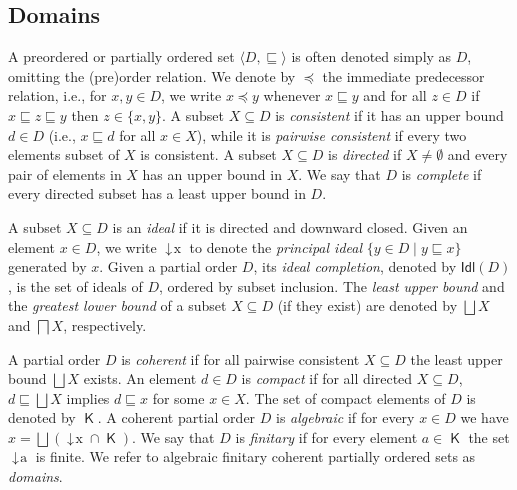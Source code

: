 \documentclass[conference]{IEEEtran}
\newcommand{\compact}[1]{\ensuremath{\mathop{\mathsf{K}({#1})}}}
\newcommand{\principal}[1]{\ensuremath{\mathop{\downarrow\!{#1}}}}
\newcommand{\ideal}[1]{\ensuremath{\mathsf{Idl}({#1})}}
\begin{document}
\subsection{Domains}
\label{ss:domains}

A preordered or partially ordered set $\langle D, \sqsubseteq \rangle$
is often denoted simply as $D$, omitting the (pre)order
relation.  We denote by
$\preceq$ the immediate predecessor relation, i.e., for $x, y \in D$, 
we write $x \preceq y$ whenever
$x \sqsubseteq y$ and for all $z \in D$ if
$x \sqsubseteq z \sqsubseteq y$ then $z \in \{x,y\}$.
%
A subset $X \subseteq D$ is \emph{consistent}
if it has an upper bound $d \in D$  (i.e., $x \sqsubseteq d$ for all $x \in X$),
while it is \emph{pairwise consistent} if
every two elements subset 
of $X$ is consistent.
%
A subset $X \subseteq D$ is \emph{directed} if $X \neq \emptyset$ and
every pair of elements in $X$ has an upper bound in $X$. We say that
$D$ is \emph{complete} if every directed subset has a least upper
bound in $D$.

A subset $X \subseteq D$ is an \emph{ideal} if it is directed and
downward closed.
%
Given an element $x \in D$, we write $\principal{x}$ to
denote the \emph{principal ideal} $\{ y \in D \mid y \sqsubseteq x \}$ generated by $x$.
Given a partial order $D$, its \emph{ideal completion}, denoted by $\ideal{D}$, is the
set of ideals of $D$,  ordered by subset inclusion.
%
The \emph{least upper bound} and the \emph{greatest lower bound} of a
subset $X \subseteq D$ (if they exist) are denoted by $\bigsqcup X$
and $\bigsqcap X$, respectively.

\begin{definition}[domains]
  \label{c-de:domain}
  A partial order $D$ is \emph{coherent} if for all
  pairwise  consistent $X \subseteq D$ the least
  upper bound $\bigsqcup X$ exists. 
  An element $d \in D$ is \emph{compact} if for all directed
  $X \subseteq D$, $d \sqsubseteq \bigsqcup X$ implies
  $d \sqsubseteq x$ for some $x \in X$. The set of compact
  elements of $D$ is denoted by $\compact{D}$.
  A coherent partial order $D$ is \emph{algebraic}
  if for every $x \in D$ we have
  $x = \bigsqcup (\principal{x} \cap \compact{D})$.  We say that $D$
  is \emph{finitary} if for every element $a \in \compact{D}$ the set
  $\principal{a}$ is finite.
  We refer to 
  algebraic finitary coherent partially ordered sets as
  \emph{domains}.
\end{definition}
\end{document}
